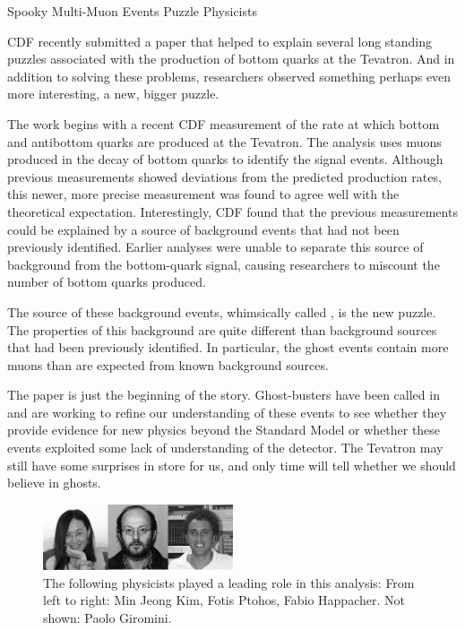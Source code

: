\begin{multimuons-2}[enhanced, tikz={rotate=0}]{Spooky Multi-Muon Events Puzzle Physicists}
  \begin{multicols}{2}
    CDF recently submitted a paper that helped to explain several long
    standing puzzles associated with the production of bottom quarks
    at the Tevatron. And in addition to solving these problems,
    researchers observed something perhaps even more interesting, a
    new, bigger puzzle. 
    
    The work begins with a recent CDF measurement of the rate at which
    bottom and antibottom quarks are produced at the Tevatron. The
    analysis uses muons produced in the decay of bottom quarks to identify
    the signal events. Although previous measurements showed deviations
    from the predicted production rates, this newer, more precise
    measurement was found to agree well with the theoretical
    expectation. Interestingly, CDF found that the previous measurements
    could be explained by a source of background events that had not been
    previously identified. Earlier analyses were unable to separate this
    source of background from the bottom-quark signal, causing researchers
    to miscount the number of bottom quarks produced. 
    
    The source of these background events, whimsically called , is the new puzzle. The properties of this background are
    quite different than background sources that had been previously
    identified. In particular, the ghost events contain more muons than
    are expected from known background sources. 
    
    The paper is just the beginning of the story. Ghost-busters have been
    called in and are working to refine our understanding of these events
    to see whether they provide evidence for new physics beyond the
    Standard Model or whether these events exploited some lack of
    understanding of the detector. The Tevatron may still have some
    surprises in store for us, and only time will tell whether we should
    believe in ghosts.
    
    \begin{figure}
      \begin{center}
        \vspace{-0.2in}
        \leavevmode
        \includegraphics[width=0.5\textwidth]{./figures/Fotios-MinJeongKimBW.jpg}
        \caption*{The following physicists played a leading role in this analysis: From
          left to right: Min Jeong Kim, Fotis Ptohos, Fabio Happacher. Not shown: Paolo Giromini.}
      \end{center}
    \end{figure}
  \end{multicols}
\end{multimuons-2}
